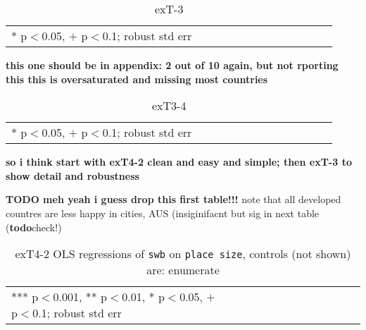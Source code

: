 \documentclass[10pt, letterpaper]{article}
\begin{document}
\begin{spacing}{1.4}
\begin{spacing}{.9} \begin{table}[H]\centering \caption{.} \label{d1} \begin{scriptsize} \begin{tabular}{p{1.8in}p{.5in}p{.5in}p{.5in}p{.5in}p{.5in}p{.5in}p{.5in}p{.5in}p{.5in}p{.5 in}p{.5in}p{.5 in}}\hline  \hline   * p$<$0.05, $+$ p$<$0.1; robust std err \end{tabular}\end{scriptsize}\caption{exT-3}\end{table} \end{spacing}



\textbf{this one should be in appendix: 2 out of 10 again, but not rporting this
this is oversaturated and missing most countries}
\begin{spacing}{.9} \begin{table}[H]\centering \caption{.} \label{d1} \begin{scriptsize} \begin{tabular}{p{1.8in}p{.5in}p{.5in}p{.5in}p{.5in}p{.5in}p{.5in}p{.5in}p{.5in}p{.5in}p{.5 in}p{.5in}p{.5 in}}\hline  \hline   * p$<$0.05, $+$ p$<$0.1; robust std err \end{tabular}\end{scriptsize}\caption{exT3-4}\end{table} \end{spacing}



\textbf{so i think start with exT4-2 clean and easy and simple; then exT-3 to
  show detail and robustness}

\textbf{TODO meh yeah i guess drop this first table!!!}
note that all developed countres are less happy in cities, AUS (insiginifacnt
but sig in next table (\textbf{todo}check!)

\begin{spacing}{.9}
  \begin{table}[H]\centering \caption{.} \label{d1} \begin{scriptsize} \begin{tabular}{p{1.8in}p{.5in}p{.5in}p{.5in}p{.5in}p{.5in}p{.5in}p{.5in}p{.5in}p{.5in}p{.5
            in}p{.5in}p{.5 in}}\hline
        
\hline  *** p$<$0.001, ** p$<$0.01, * p$<$0.05, $+$ p$<$0.1; robust std err
         \end{tabular}\end{scriptsize}\caption{exT4-2 OLS regressions of
         \texttt{swb} on \texttt{place size}, controls (not shown) are: enumerate}\end{table}
\end{spacing}


\end{spacing}
\end{document}
